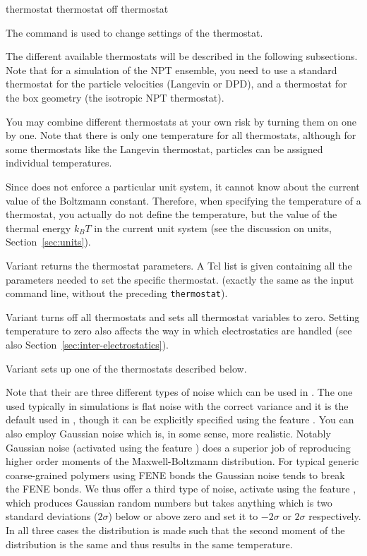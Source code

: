 \begin{essyntax}
   thermostat
   thermostat off
   thermostat 
\end{essyntax}

The  command is used to change settings of the
thermostat. 

The different available thermostats will be described in the following
subsections. Note that for a simulation of the NPT ensemble, you need
to use a standard thermostat for the particle velocities (\eg Langevin
or DPD), and a thermostat for the box geometry (\eg the isotropic NPT
thermostat).

You may combine different thermostats at your own risk by turning them
on one by one. Note that there is only one temperature for all
thermostats, although for some thermostats like the Langevin thermostat,
particles can be assigned individual temperatures.

Since \es{} does not enforce a particular unit system, it cannot know
about the current value of the Boltzmann constant. Therefore, when
specifying the temperature of a thermostat, you actually do not define
the temperature, but the value of the thermal energy $k_B T$ in the
current unit system (see the discussion on units, Section~\ref{sec:units}).

Variant  returns the thermostat parameters. A Tcl list is
given containing all the parameters needed to set the specific
thermostat. (exactly the same as the input command line, without the
preceding \texttt{thermostat}).

Variant  turns off all thermostats and sets all thermostat 
variables to zero. Setting temperature to zero also affects the way in which 
electrostatics are handled (see also Section~\ref{sec:inter-electrostatics}).

Variant  sets up one of the thermostats described below.

Note that their are three different types of noise which can be used
in \es. The one used typically in simulations is flat noise with the
correct variance and it is the default used in \es, though it can be
explicitly specified using the feature .  You can
also employ Gaussian noise which is, in some sense, more realistic.
Notably Gaussian noise (activated using the feature
) does a superior job of reproducing higher order
moments of the Maxwell-Boltzmann distribution.  For typical generic
coarse-grained polymers using FENE bonds the Gaussian noise tends to
break the FENE bonds.  We thus offer a third type of noise, activate
using the feature , which produces Gaussian
random numbers but takes anything which is two standard deviations
($2\sigma$) below or above zero and set it to $-2\sigma$ or $2\sigma$
respectively. In all three cases the distribution is made such that
the second moment of the distribution is the same and thus results in
the same temperature.

